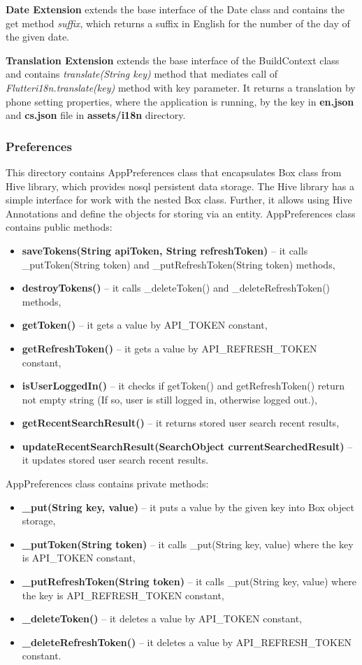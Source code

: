 \textbf{Date Extension} extends the base interface of the Date class and contains the get method \textit{suffix}, which returns a suffix in English for the number of the day of the given date.

\textbf{Translation Extension} extends the base interface of the BuildContext class and contains \textit{translate(String key)} method that mediates call of \textit{Flutteri18n.translate(key)} method with key parameter.
It returns a translation by phone setting properties, where the application is running, by the key in  \textbf{en.json} and \textbf{cs.json} file in \textbf{assets/i18n} directory.


\subsubsection{Preferences}\label{subsubsec:preferences}
This directory contains AppPreferences class that encapsulates Box class from Hive library, which provides \acrshort{nosql} persistent data storage.
The Hive library has a simple interface for work with the nested Box class.
Further, it allows using Hive Annotations and define the objects for storing via an entity.
AppPreferences class contains public methods:
\begin{itemize}
    \item \textbf{saveTokens(String apiToken, String refreshToken)} -- it calls \newline\_putToken(String token) and \_putRefreshToken(String token) methods,
    \item \textbf{destroyTokens()} -- it calls \_deleteToken() and \_deleteRefreshToken() methods,
    \item \textbf{getToken()} -- it gets a value by API\_TOKEN constant,
    \item \textbf{getRefreshToken()} -- it gets a value by API\_REFRESH\_TOKEN constant,
    \item \textbf{isUserLoggedIn()} -- it checks if getToken() and getRefreshToken() return not empty string (If so, user is still logged in, otherwise logged out.),
    \item \textbf{getRecentSearchResult()} -- it returns stored user search recent results,
    \item \textbf{updateRecentSearchResult(SearchObject currentSearchedResult)} -- it updates stored user search recent results.
\end{itemize}
AppPreferences class contains private methods:
\begin{itemize}
    \item \textbf{\_put(String key, value)} -- it puts a value by the given key into Box object storage,
    \item \textbf{\_putToken(String token)} -- it calls \_put(String key, value) where the key is API\_TOKEN constant,
    \item \textbf{\_putRefreshToken(String token)} -- it calls \_put(String key, value) where the key is API\_REFRESH\_TOKEN constant,
    \item \textbf{\_deleteToken()} -- it deletes a value by API\_TOKEN constant,
    \item \textbf{\_deleteRefreshToken()} -- it deletes a value by API\_REFRESH\_TOKEN constant.
\end{itemize}
